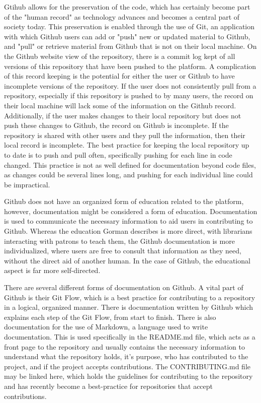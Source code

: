 Gtihub allows for the preservation of the code, which has certainly become part of the "human record" as technology advances and becomes a central part of society today. This preservation is enabled through the use of Git, an application with which Github users can add or "push" new or updated material to Github, and "pull" or retrieve material from Github that is not on their local machine. On the Github website view of the repository, there is a commit log kept of all versions of this repository that have been pushed to the platform. A complication of this record keeping is the potential for either the user or Github to have incomplete versions of the repository. If the user does not consistently pull from a repository, especially if this repository is pushed to by many users, the record on their local machine will lack some of the information on the Github record. Additionally, if the user makes changes to their local repository but does not push these changes to Github, the record on Github is incomplete. If the repository is shared with other users and they pull the information, then their local record is incomplete. The best practice for keeping the local repository up to date is to push and pull often, specifically pushing for each line in code changed. This practice is not as well defined for documentation beyond code files, as changes could be several lines long, and pushing for each individual line could be impractical. 

Github does not have an organized form of education related to the platform, however, documentation might be considered a form of education. Documentation is used to communicate the necessary information to aid users in contributing to Github. Whereas the education Gorman describes is more direct, with librarians interacting with patrons to teach them, the Github documentation is more individualized, where users are free to consult that information as they need, without the direct aid of another human. In the case of Github, the educational aspect is far more self-directed. 

There are several different forms of documentation on Github. A vital part of Github is their Git Flow, which is a best practice for contributing to a repository in a logical, organized manner. There is documentation written by Github which explains each step of the Git Flow, from start to finish. There is also documentation for the use of Markdown, a language used to write documentation. This is used specifically in the README.md file, which acts as a front page to the repository and usually contains the necessary information to understand what the repository holds, it's purpose, who has contributed to the project, and if the project accepts contributions. The CONTRIBUTING.md file may be linked here, which holds the guidelines for contributing to the repository and has recently become a best-practice for repositories that accept contributions. 

